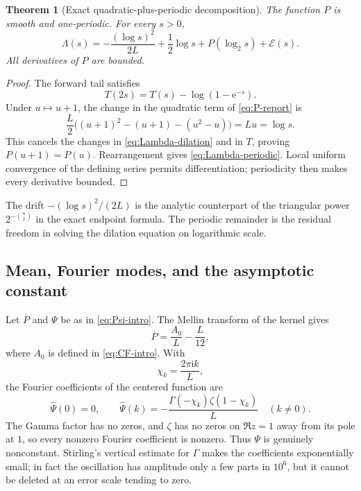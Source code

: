 \documentclass[11pt,oneside]{article}
\newtheorem{theorem}{Theorem}[section]
\theoremstyle{definition}
\theoremstyle{remark}
\newcommand{\e}{\mathrm e}
\newcommand{\ii}{\mathrm i}
\newcommand{\Lam}{\Lambda}
\begin{document}
\begin{theorem}[Exact quadratic-plus-periodic decomposition]
\label{thm:periodic-decomposition}
The function $P$ is smooth and one-periodic.  For every $s>0$,
\begin{equation}
 \boxed{
 \Lam(s)=-\frac{(\log s)^2}{2L}+\frac12\log s
 +P(\log_2s)+\mathcal E(s).}                               \label{eq:Lambda-periodic}
\end{equation}
All derivatives of $P$ are bounded.
\end{theorem}

\begin{proof}
The forward tail satisfies
\begin{equation*}
 T(2s)=T(s)-\log(1-\e^{-s}).
\end{equation*}
Under $u\mapsto u+1$, the change in the quadratic term of \eqref{eq:P-report} is
\begin{equation*}
 \frac L2\bigl((u+1)^2-(u+1)-(u^2-u)\bigr)=Lu=\log s.
\end{equation*}
This cancels the changes in \eqref{eq:Lambda-dilation} and in $T$, proving
$P(u+1)=P(u)$.  Rearrangement gives \eqref{eq:Lambda-periodic}.  Local uniform convergence of
the defining series permits differentiation; periodicity then makes every derivative bounded.
\end{proof}

The drift $-(\log s)^2/(2L)$ is the analytic counterpart of the triangular power
$2^{-\binom n2}$ in the exact endpoint formula.  The periodic remainder is the residual
freedom in solving the dilation equation on logarithmic scale.

\subsection{Mean, Fourier modes, and the asymptotic constant}

Let $\overline P$ and $\Psi$ be as in \eqref{eq:Psi-intro}.  The Mellin transform of the
kernel gives
\begin{equation}
 \overline P=\frac{A_0}{L}-\frac L{12},                     \label{eq:P-mean}
\end{equation}
where $A_0$ is defined in \eqref{eq:CF-intro}.  With
\begin{equation}
 \chi_k=\frac{2\pi\ii k}{L},                                \label{eq:chi}
\end{equation}
the Fourier coefficients of the centered function are
\begin{equation}
 \widehat\Psi(0)=0,
 \qquad
 \boxed{
 \widehat\Psi(k)=-\frac{\Gamma(-\chi_k)\zeta(1-\chi_k)}L}
 \quad(k\ne0).                                             \label{eq:Psi-Fourier-report}
\end{equation}
The Gamma factor has no zeros, and $\zeta$ has no zeros on $\Re z=1$ away from its pole at
$1$, so every nonzero Fourier coefficient is nonzero.  Thus $\Psi$ is genuinely nonconstant.
Stirling's vertical estimate for $\Gamma$ makes the coefficients exponentially small; in
fact the oscillation has amplitude only a few parts in $10^6$, but it cannot be deleted at an
error scale tending to zero.
\end{document}
